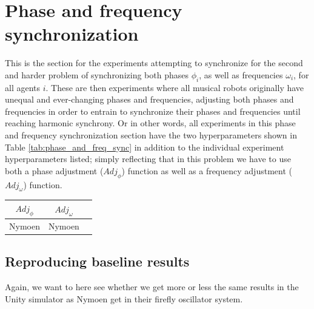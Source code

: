 \section{Phase and frequency synchronization}
\label{sec:phase_and_freq_sync_experiments}
This is the section for the experiments attempting to synchronize for the second and harder problem of synchronizing both phases $\phi_i$, as well as frequencies $\omega_i$, for all agents $i$. These are then experiments where all musical robots originally have unequal and ever-changing phases and frequencies, adjusting both phases and frequencies in order to entrain to synchronize their phases and frequencies until reaching harmonic synchrony. Or in other words, all experiments in this phase and frequency synchronization section have the two hyperparameters shown in Table \ref{tab:phase_and_freq_sync} in addition to the individual experiment hyperparameters listed; simply reflecting that in this problem we have to use both a phase adjustment ($Adj_{\phi}$) function as well as a frequency adjustment ($Adj_{\omega}$) function.

\begin{center}
\begin{tabular}{ |c|c|c| } 
\hline
$Adj_\phi$ & $Adj_\omega$ \\
\hline
Nymoen & Nymoen  \\
\hline
\end{tabular}
\label{tab:phase_and_freq_sync}
\end{center}


	
	
	

	\subsection{Reproducing baseline results}
	Again, we want to here see whether we get more or less the same results in the Unity simulator as Nymoen get in their firefly oscillator system.
	
